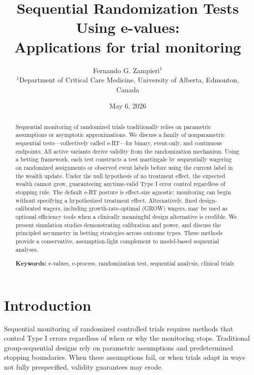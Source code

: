 \documentclass[10pt]{article}
\title{Sequential Randomization Tests Using e-values:\\ Applications for trial monitoring}
\author{
  Fernando G. Zampieri$^{1}$
  \\[1em]
  \small $^1$Department of Critical Care Medicine, University of Alberta, Edmonton, Canada \\
}
\date{May 6, 2026}
\begin{document}
\maketitle

\begin{abstract}
Sequential monitoring of randomized trials traditionally relies on parametric assumptions or asymptotic approximations. We discuss a family of nonparametric sequential tests---collectively called e-RT---for binary, event-only, and continuous endpoints. All active variants derive validity from the randomization mechanism. Using a betting framework, each test constructs a test martingale by sequentially wagering on randomized assignments or observed event labels before using the current label in the wealth update. Under the null hypothesis of no treatment effect, the expected wealth cannot grow, guaranteeing anytime-valid Type I error control regardless of stopping rule. The default e-RT posture is effect-size agnostic: monitoring can begin without specifying a hypothesized treatment effect. Alternatively, fixed design-calibrated wagers, including growth-rate-optimal (GROW) wagers, may be used as optional efficiency tools when a clinically meaningful design alternative is credible. We present simulation studies demonstrating calibration and power, and discuss the principled asymmetry in betting strategies across outcome types. These methods provide a conservative, assumption-light complement to model-based sequential analyses.

\medskip
\noindent\textbf{Keywords:} e-values, e-process, randomization test, sequential analysis, clinical trials
\end{abstract}

\section{Introduction}

Sequential monitoring of randomized controlled trials requires methods that control Type I errors regardless of when or why the monitoring stops. Traditional group-sequential designs rely on parametric assumptions and predetermined stopping boundaries. When these assumptions fail, or when trials adapt in ways not fully prespecified, validity guarantees may erode.
\end{document}
